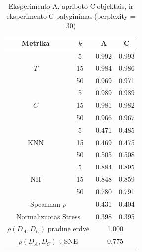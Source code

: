 \begin{table}[H]
\centering
\caption{Eksperimento A, apriboto C objektais, ir eksperimento C palyginimas (perplexity = \num{30})}
\label{tab:tsne_A_C}
\begin{tabular}{|c|c|c|c|}
\hline
Metrika & $k$ & A & C \\
\hline
\multirow{3}{*}{$T$} & \num{5} & \num{0.992} & \num{0.993} \\
\cline{2-4}
 & \num{15} & \num{0.984} & \num{0.986} \\
\cline{2-4}
 & \num{50} & \num{0.969} & \num{0.971} \\
\hline
\multirow{3}{*}{$C$} & \num{5} & \num{0.989} & \num{0.989} \\
\cline{2-4}
 & \num{15} & \num{0.981} & \num{0.982} \\
\cline{2-4}
 & \num{50} & \num{0.966} & \num{0.967} \\
\hline
\multirow{3}{*}{KNN} & \num{5} & \num{0.471} & \num{0.485} \\
\cline{2-4}
 & \num{15} & \num{0.469} & \num{0.475} \\
\cline{2-4}
 & \num{50} & \num{0.505} & \num{0.508} \\
\hline
\multirow{3}{*}{NH} & \num{5} & \num{0.884} & \num{0.895} \\
\cline{2-4}
 & \num{15} & \num{0.848} & \num{0.859} \\
\cline{2-4}
 & \num{50} & \num{0.780} & \num{0.791} \\
\hline
\multicolumn{2}{|c|}{Spearman $\rho$} & \num{0.431} & \num{0.404} \\
\hline
\multicolumn{2}{|c|}{Normalizuotas Stress} & \num{0.398} & \num{0.395} \\
\hline
\multicolumn{2}{|c|}{$\rho(D_{A}, D_{C})$ pradinė erdvė} & \multicolumn{2}{c|}{\num{1.000}} \\
\hline
\multicolumn{2}{|c|}{$\rho(D_{A}, D_{C})$ t-SNE} & \multicolumn{2}{c|}{\num{0.775}} \\
\hline
\end{tabular}
\end{table}
